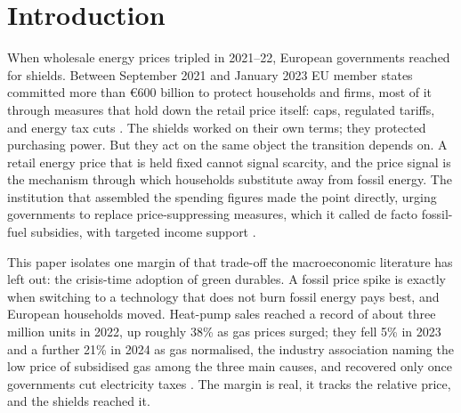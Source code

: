 %

\section{Introduction}\label{sec:intro}

When wholesale energy prices tripled in 2021--22, European governments reached for
shields. Between September 2021 and January 2023 EU member states committed more
than \euro{}600 billion to protect households and firms, most of it through
measures that hold down the retail price itself: caps, regulated tariffs, and
energy tax cuts \citep{Bruegel2023}. The shields worked on their own terms; they
protected purchasing power. But they act on the same object the transition depends
on. A retail energy price that is held fixed cannot signal scarcity, and the price
signal is the mechanism through which households substitute away from fossil
energy. The institution that assembled the spending figures made the point
directly, urging governments to replace price-suppressing measures, which it
called de facto fossil-fuel subsidies, with targeted income support
\citep{Bruegel2023}.

This paper isolates one margin of that trade-off the macroeconomic literature has
left out: the crisis-time adoption of green durables. A fossil price spike is
exactly when switching to a technology that does not burn fossil energy pays best,
and European households moved. Heat-pump sales reached a record of about three
million units in 2022, up roughly 38\% as gas prices surged; they fell 5\% in 2023
and a further 21\% in 2024 as gas normalised, the industry association naming the
low price of subsidised gas among the three main causes, and recovered only once
governments cut electricity taxes \citep{EHPA2023,EHPA2024,EHPA2025}. The margin is
real, it tracks the relative price, and the shields reached it.

